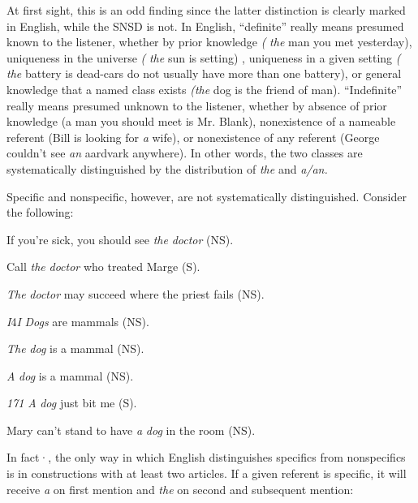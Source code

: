 At first sight, this is an odd finding since the latter distinction is clearly marked in English, while the SNSD is not. In English, ``definite'' really means presumed known to the listener, whether by prior knowledge \textit{(} \textit{{\textquotedbl}the} man you met yesterday{\textquotedbl}), uniqueness in the universe \textit{(} \textit{{\textquotedbl}the} sun is setting{\textquotedbl}) , uniqueness in a given setting \textit{(} \textit{{\textquotedbl}the} battery is dead{\textquotedbl}-cars do not usually have more than one battery), or general knowledge that a named class exists \textit{({\textquotedbl}the} dog is the friend of man{\textquotedbl}). ``Indefinite'' really means presumed unknown to the listener, whether by absence of prior knowledge ({\textquotedbl}a man you should meet is Mr. Blank{\textquotedbl}), nonexistence of a nameable referent ({\textquotedbl}Bill is looking for \textit{a} wife{\textquotedbl}), or nonexistence of any referent ({\textquotedbl}George couldn't see \textit{an} aardvark anywhere{\textquotedbl}). In other words, the two classes are systematically distinguished by the distribution of \textit{the} and \textit{a/an.}

Specific and nonspecific, however, are not systematically dis\-tinguished. Consider the following:

\ea\label{ex:1}
 If you're sick, you should see \textit{the} \textit{doctor} (NS).
\glt
\z

\ea\label{ex:2}
 Call \textit{the} \textit{doctor} who treated Marge (S).
\glt
\z

\ea\label{ex:3}
 \textit{The} \textit{doctor} may succeed where the priest fails (NS).
\glt
\z

\textit{I}4\textit{I }\textit{Dogs} are mammals (NS).

\ea\label{ex:5}
 \textit{The} \textit{dog} is a mammal (NS).
\glt
\z

\ea\label{ex:6}
 \textit{A} \textit{dog} is a mammal (NS).
\glt
\z


\textit{171 }\textit{A} \textit{dog} just bit me (S).

\ea\label{ex:8}
 Mary can't stand to have \textit{a} \textit{dog} in the room (NS).
\glt
\z

In fact·, the only way in which English distinguishes specifics from nonspecifics is in constructions with at least two articles. If a given referent is specific, it will receive \textit{a} on first mention and \textit{the} on second and subsequent mention:

